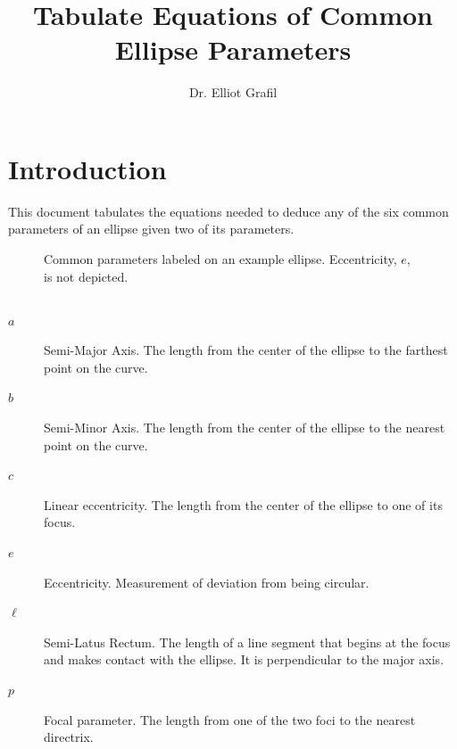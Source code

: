 \documentclass{article}
\title{\vspace{-2.5cm}Tabulate Equations of Common Ellipse Parameters}
\author{Dr. Elliot Grafil}
\begin{document}
\maketitle
\section*{Introduction}
This document tabulates the equations needed to deduce any of the six common parameters of an ellipse given two of its parameters. 
\begin{figure}[H]
\begin{center}
\noindent{}
  \caption{Common parameters labeled on an example ellipse. Eccentricity, $e$, is not depicted.}
  \label{fig:boat1}
  \end{center}
\end{figure}
\subsection*{}
\begin{description}
\item[$a$] Semi-Major Axis. The length from the center of the ellipse to the farthest point on the curve.
\item[$b$] Semi-Minor Axis. The length from the center of the ellipse to the nearest point on the curve.
\item[$c$] Linear eccentricity. The length from the center of the ellipse to one of its focus.
\item[$e$] Eccentricity. Measurement of deviation from being circular.
\item[$\ell$] Semi-Latus Rectum. The length of a line segment that begins at the focus and makes contact with the ellipse. It is perpendicular to the major axis.
\item[$p$] Focal parameter. The length from one of the two foci to the nearest directrix. 
\end{description}
\end{document}
